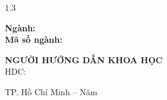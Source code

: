 \thispagestyle{empty}
\begin{center}
\begin{spacing}{1.3}

{\fontsize{13}{16}\selectfont \dhqg \par}
{\fontsize{13}{16}\selectfont \bfseries \truong \par}

\vspace{2cm}

{\fontsize{14}{17}\selectfont \bfseries \MakeUppercase{\hvchname} \par}

\vspace{1.8cm}

{\fontsize{16}{20}\selectfont \bfseries \MakeUppercase{\thesistitle} \par}

\vspace{1.5cm}

\end{spacing}
\end{center}

{\fontsize{13}{18}\selectfont
\begin{flushleft}
\hspace{1.5cm}\textbf{Ngành:} \nganh\\[2pt]
\hspace{1.5cm}\textbf{Mã số ngành:} \masonganh
\end{flushleft}
}

\vspace{1.5cm}

{\fontsize{13}{18}\selectfont
\begin{flushleft}
\hspace{1.5cm}\textbf{NGƯỜI HƯỚNG DẪN KHOA HỌC}\\[4pt]
\hspace{1.5cm}HDC: \cbhd
\end{flushleft}
}

\vfill

\begin{center}
{\fontsize{12}{15}\selectfont TP. Hồ Chí Minh {–} Năm \nambaove \par}
\end{center}
\clearpage
